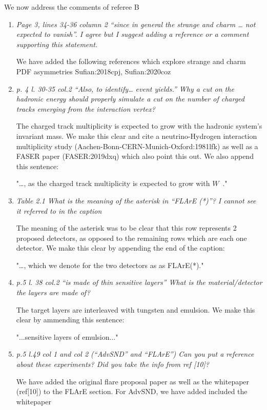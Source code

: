 \documentclass[11pt,a4paper]{article}
\begin{document}
\noindent
We now address the comments of referee B

\begin{enumerate}
\item{\it Page 3, lines 34-36 column 2 “since in general the strange and charm … not expected to vanish”. I agree but I suggest adding a reference or a comment supporting this statement. }

We have added the following references which explore strange and charm PDF asymmetries Sufian:2018cpj, Sufian:2020coz

\item{\it p. 4 l. 30-35 col.2 “Also, to identify… event yields.” Why a cut on the hadronic energy should properly simulate a cut on the number of charged tracks emerging from the interaction vertex?}

The charged track multiplicity is expected to grow with the hadronic system’s invariant mass. We make this clear and cite a neutrino-Hydrogen interaction multiplicity study (Aachen-Bonn-CERN-Munich-Oxford:1981lfk) as well as a FASER paper (FASER:2019dxq) which also point this out. We also append this sentence:

"…, as the charged track multiplicity is expected to grow with $W$~\cite{Aachen-Bonn-CERN-Munich-Oxford:1981lfk,FASER:2019dxq}."


\item{\it Table 2.1 What is the meaning of the asterisk in “FLArE (*)”? I cannot see it referred to in the caption} 

The meaning of the asterisk was to be clear that this row represents 2 proposed detectors, as opposed to the remaining rows which are each one detector. We make this clear by appending the end of the caption:

"…, which we denote for the two detectors as as FLArE(*)."

\item{\it  p.5 l. 38 col.2 “is made of thin sensitive layers” What is the material/detector the layers are made of?}

The target layers are interleaved with tungsten and emulsion. We make this clear by ammending this sentence:

"...sensitive layers of emulsion..."

\item{\it  p.5 l.49 col 1 and col 2 (“AdvSND” and “FLArE”) Can you put a reference about these experiments? Did you take the info from ref [10]?}

We have added the original flare proposal paper as well as the whitepaper (ref[10]) to the FLArE section. For AdvSND, we have added included the whitepaper  


\end{enumerate}
\end{document}
